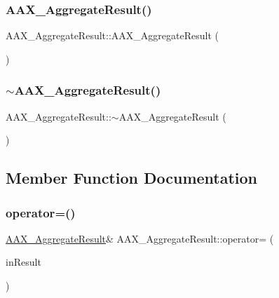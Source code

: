 \subsubsection{\texorpdfstring{AAX\_AggregateResult()}{AAX\_AggregateResult()}}
{\footnotesize\ttfamily A\+A\+X\+\_\+\+Aggregate\+Result\+::\+A\+A\+X\+\_\+\+Aggregate\+Result (\begin{DoxyParamCaption}{ }\end{DoxyParamCaption})\hspace{0.3cm}{\ttfamily [inline]}}

\mbox{\label{a01605_a09e9058ca4ec5df47741cef7e44cf165}} 
\subsubsection{\texorpdfstring{$\sim$AAX\_AggregateResult()}{~AAX\_AggregateResult()}}
{\footnotesize\ttfamily A\+A\+X\+\_\+\+Aggregate\+Result\+::$\sim$\+A\+A\+X\+\_\+\+Aggregate\+Result (\begin{DoxyParamCaption}{ }\end{DoxyParamCaption})\hspace{0.3cm}{\ttfamily [inline]}}



\subsection{Member Function Documentation}
\mbox{\label{a01605_a352314f927d81c236d8022b277853155}} 
\subsubsection{\texorpdfstring{operator=()}{operator=()}}
{\footnotesize\ttfamily \mbox{\hyperlink{a01605}{A\+A\+X\+\_\+\+Aggregate\+Result}}\& A\+A\+X\+\_\+\+Aggregate\+Result\+::operator= (\begin{DoxyParamCaption}\item[{\mbox{\hyperlink{a00392_a4d8f69a697df7f70c3a8e9b8ee130d2f}{A\+A\+X\+\_\+\+Result}}}]{in\+Result }\end{DoxyParamCaption})\hspace{0.3cm}{\ttfamily [inline]}}



